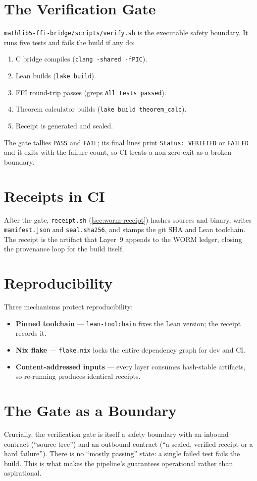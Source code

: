 \section{The Verification Gate}
\label{sec:build-gate}

\texttt{mathlib5-ffi-bridge/scripts/verify.sh} is the executable safety
boundary. It runs five tests and fails the build if any do:
\begin{enumerate}
  \item C bridge compiles (\texttt{clang -shared -fPIC}).
  \item Lean builds (\texttt{lake build}).
  \item FFI round-trip passes (greps \texttt{All tests passed}).
  \item Theorem calculator builds (\texttt{lake build theorem\_calc}).
  \item Receipt is generated and sealed.
\end{enumerate}
The gate tallies \texttt{PASS} and \texttt{FAIL}; its final lines print
\texttt{Status: VERIFIED} or \texttt{FAILED} and it exits with the failure
count, so CI treats a non-zero exit as a broken boundary.

\section{Receipts in CI}
\label{sec:build-receipt}

After the gate, \texttt{receipt.sh} (\cref{sec:worm-receipt}) hashes sources
and binary, writes \texttt{manifest.json} and \texttt{seal.sha256}, and stamps
the git SHA and Lean toolchain. The receipt is the artifact that Layer~9
appends to the WORM ledger, closing the provenance loop for the build itself.

\section{Reproducibility}
\label{sec:build-repro}

Three mechanisms protect reproducibility:
\begin{itemize}
  \item \textbf{Pinned toolchain} --- \texttt{lean-toolchain} fixes the Lean
        version; the receipt records it.
  \item \textbf{Nix flake} --- \texttt{flake.nix} locks the entire dependency
        graph for dev and CI.
  \item \textbf{Content-addressed inputs} --- every layer consumes hash-stable
        artifacts, so re-running produces identical receipts.
\end{itemize}

\section{The Gate as a Boundary}
\label{sec:build-asboundary}

Crucially, the verification gate is itself a safety boundary with an inbound
contract (``source tree'') and an outbound contract (``a sealed, verified
receipt or a hard failure''). There is no ``mostly passing'' state: a single
failed test fails the build. This is what makes the pipeline's guarantees
operational rather than aspirational.

